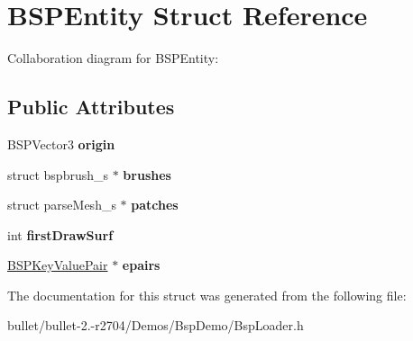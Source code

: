 \hypertarget{struct_b_s_p_entity}{\section{B\+S\+P\+Entity Struct Reference}
\label{struct_b_s_p_entity}
}


Collaboration diagram for B\+S\+P\+Entity\+:
\subsection*{Public Attributes}
\begin{DoxyCompactItemize}
\item 
\hypertarget{struct_b_s_p_entity_a201a465f02177d36d03577d2ab916f92}{B\+S\+P\+Vector3 {\bfseries origin}}\label{struct_b_s_p_entity_a201a465f02177d36d03577d2ab916f92}

\item 
\hypertarget{struct_b_s_p_entity_a4e2387950fe679ece209296a1f96e161}{struct bspbrush\+\_\+s $\ast$ {\bfseries brushes}}\label{struct_b_s_p_entity_a4e2387950fe679ece209296a1f96e161}

\item 
\hypertarget{struct_b_s_p_entity_ad255c885c8a6835fe3f4ec34cc7d533b}{struct parse\+Mesh\+\_\+s $\ast$ {\bfseries patches}}\label{struct_b_s_p_entity_ad255c885c8a6835fe3f4ec34cc7d533b}

\item 
\hypertarget{struct_b_s_p_entity_a822bffb2bd42fbb428fca249c7a161f1}{int {\bfseries first\+Draw\+Surf}}\label{struct_b_s_p_entity_a822bffb2bd42fbb428fca249c7a161f1}

\item 
\hypertarget{struct_b_s_p_entity_a2df61ce016e9211e60974a5833f492eb}{\hyperlink{struct_b_s_p_pair}{B\+S\+P\+Key\+Value\+Pair} $\ast$ {\bfseries epairs}}\label{struct_b_s_p_entity_a2df61ce016e9211e60974a5833f492eb}

\end{DoxyCompactItemize}


The documentation for this struct was generated from the following file\+:\begin{DoxyCompactItemize}
\item 
bullet/bullet-\/2.-\/r2704/\+Demos/\+Bsp\+Demo/Bsp\+Loader.\+h\end{DoxyCompactItemize}
